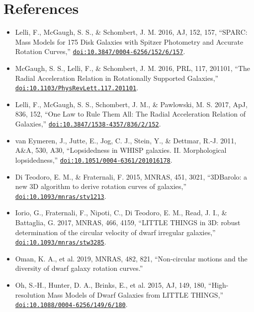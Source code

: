\documentclass[11pt]{article}
\begin{document}
\section*{References}
\begin{itemize}
\item Lelli, F., McGaugh, S. S., \& Schombert, J. M. 2016, AJ, 152, 157, ``SPARC: Mass Models for 175 Disk Galaxies with Spitzer Photometry and Accurate Rotation Curves,'' \href{https://doi.org/10.3847/0004-6256/152/6/157}{\nolinkurl{doi:10.3847/0004-6256/152/6/157}}.
\item McGaugh, S. S., Lelli, F., \& Schombert, J. M. 2016, PRL, 117, 201101, ``The Radial Acceleration Relation in Rotationally Supported Galaxies,'' \href{https://doi.org/10.1103/PhysRevLett.117.201101}{\nolinkurl{doi:10.1103/PhysRevLett.117.201101}}.
\item Lelli, F., McGaugh, S. S., Schombert, J. M., \& Pawlowski, M. S. 2017, ApJ, 836, 152, ``One Law to Rule Them All: The Radial Acceleration Relation of Galaxies,'' \href{https://doi.org/10.3847/1538-4357/836/2/152}{\nolinkurl{doi:10.3847/1538-4357/836/2/152}}.
\item van Eymeren, J., Jutte, E., Jog, C. J., Stein, Y., \& Dettmar, R.-J. 2011, A\&A, 530, A30, ``Lopsidedness in WHISP galaxies. II. Morphological lopsidedness,'' \href{https://doi.org/10.1051/0004-6361/201016178}{\nolinkurl{doi:10.1051/0004-6361/201016178}}.
\item Di Teodoro, E. M., \& Fraternali, F. 2015, MNRAS, 451, 3021, ``3DBarolo: a new 3D algorithm to derive rotation curves of galaxies,'' \href{https://doi.org/10.1093/mnras/stv1213}{\nolinkurl{doi:10.1093/mnras/stv1213}}.
\item Iorio, G., Fraternali, F., Nipoti, C., Di Teodoro, E. M., Read, J. I., \& Battaglia, G. 2017, MNRAS, 466, 4159, ``LITTLE THINGS in 3D: robust determination of the circular velocity of dwarf irregular galaxies,'' \href{https://doi.org/10.1093/mnras/stw3285}{\nolinkurl{doi:10.1093/mnras/stw3285}}.
\item Oman, K. A., et al. 2019, MNRAS, 482, 821, ``Non-circular motions and the diversity of dwarf galaxy rotation curves.''
\item Oh, S.-H., Hunter, D. A., Brinks, E., et al. 2015, AJ, 149, 180, ``High-resolution Mass Models of Dwarf Galaxies from LITTLE THINGS,'' \href{https://doi.org/10.1088/0004-6256/149/6/180}{\nolinkurl{doi:10.1088/0004-6256/149/6/180}}.
\end{itemize}
\end{document}

